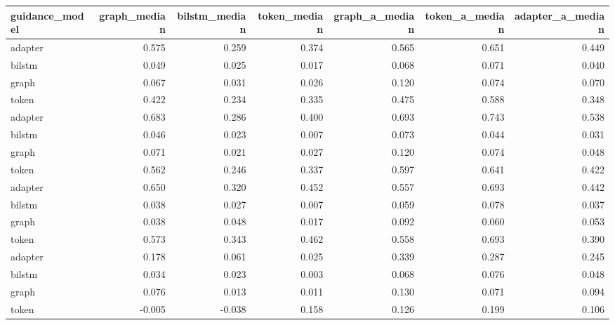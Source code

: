 \begin{tabular}{lrrrrrr}
\toprule
guidance_model & graph_median & bilstm_median & token_median & graph_a_median & token_a_median & adapter_a_median \\
\midrule
adapter & 0.575 & 0.259 & 0.374 & 0.565 & 0.651 & 0.449 \\
bilstm & 0.049 & 0.025 & 0.017 & 0.068 & 0.071 & 0.040 \\
graph & 0.067 & 0.031 & 0.026 & 0.120 & 0.074 & 0.070 \\
token & 0.422 & 0.234 & 0.335 & 0.475 & 0.588 & 0.348 \\
adapter & 0.683 & 0.286 & 0.400 & 0.693 & 0.743 & 0.538 \\
bilstm & 0.046 & 0.023 & 0.007 & 0.073 & 0.044 & 0.031 \\
graph & 0.071 & 0.021 & 0.027 & 0.120 & 0.074 & 0.048 \\
token & 0.562 & 0.246 & 0.337 & 0.597 & 0.641 & 0.422 \\
adapter & 0.650 & 0.320 & 0.452 & 0.557 & 0.693 & 0.442 \\
bilstm & 0.038 & 0.027 & 0.007 & 0.059 & 0.078 & 0.037 \\
graph & 0.038 & 0.048 & 0.017 & 0.092 & 0.060 & 0.053 \\
token & 0.573 & 0.343 & 0.462 & 0.558 & 0.693 & 0.390 \\
adapter & 0.178 & 0.061 & 0.025 & 0.339 & 0.287 & 0.245 \\
bilstm & 0.034 & 0.023 & 0.003 & 0.068 & 0.076 & 0.048 \\
graph & 0.076 & 0.013 & 0.011 & 0.130 & 0.071 & 0.094 \\
token & -0.005 & -0.038 & 0.158 & 0.126 & 0.199 & 0.106 \\
\bottomrule
\end{tabular}
